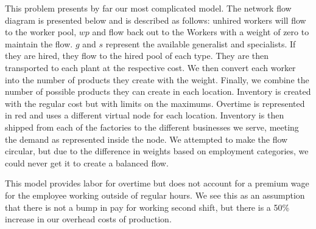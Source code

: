 \documentclass[11pt]{article}
\begin{document}
\begin{enumerate}
This problem presents by far our most complicated model.  The network flow diagram is presented below and is described as follows: unhired workers will flow to the worker pool, $wp$ and flow back out to the Workers with a weight of zero to maintain the flow.  $g$ and $s$ represent the available generalist and specialists.  If they are hired, they flow to the hired pool of each type.  They are then transported to each plant at the respective cost.  We then convert each worker into the number of products they create with the weight.  Finally, we combine the number of possible products they can create in each location.  Inventory is created with the regular cost but with limits on the maximums.  Overtime is represented in red and uses a different virtual node for each location.  Inventory is then shipped from each of the factories to the different businesses we serve, meeting the demand as represented inside the node.  We attempted to make the flow circular, but due to the difference in weights based on employment categories, we could never get it to create a balanced flow.

This model provides labor for overtime but does not account for a premium wage for the employee working outside of regular hours.  We see this as an assumption that there is not a bump in pay for working second shift, but there is a 50\% increase in our overhead costs of production.

\end{enumerate}
\end{document}
